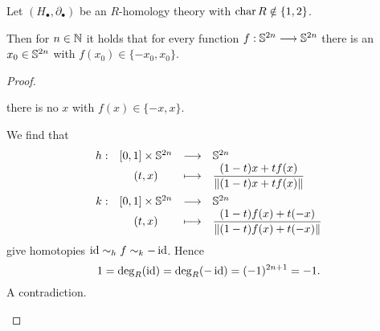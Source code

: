 	\begin{theorem}
		Let $(H_\bullet, \partial_\bullet)$ be an $R$-homology theory with $\characteristic R \notin \{1,2\}$.

		Then for $n \in \N$ it holds that for every function $f: \S^{2n} --> \S^{2n}$ there is an $x_0 \in \S^{2n}$ with $f(x_0) \in \{-x_0,x_0\}$. 
	\end{theorem}
	\begin{proof}
		\begin{assume}
			there is no $x$ with $f(x) \in \{-x,x\}$.
				
			We find that
			\begin{equation*}
				\begin{array}{rccl}
					h: &[0,1] \times \S^{2n} & \longrightarrow & \S^{2n}\\
					&(t,x) & \longmapsto & \dfrac{(1-t)x + tf(x)}{\Norm{(1-t)x + tf(x)}}\vspace{.5em}\\
					k: &[0,1] \times \S^{2n} & \longrightarrow & \S^{2n}\\
					&(t,x) & \longmapsto & \dfrac{(1-t)f(x) + t(-x)}{\Norm{(1-t)f(x) + t(-x)}}
				\end{array}
			\end{equation*}
			give homotopies $\id \sim_h f \sim_k -\id$. Hence
			\begin{equation*}
				1 = \deg_R(\id) = \deg_R(-\id) = (-1)^{2n+1} = -1.
			\end{equation*}
			A contradiction. \vspace{-2em}
		\end{assume} 
	\end{proof}

